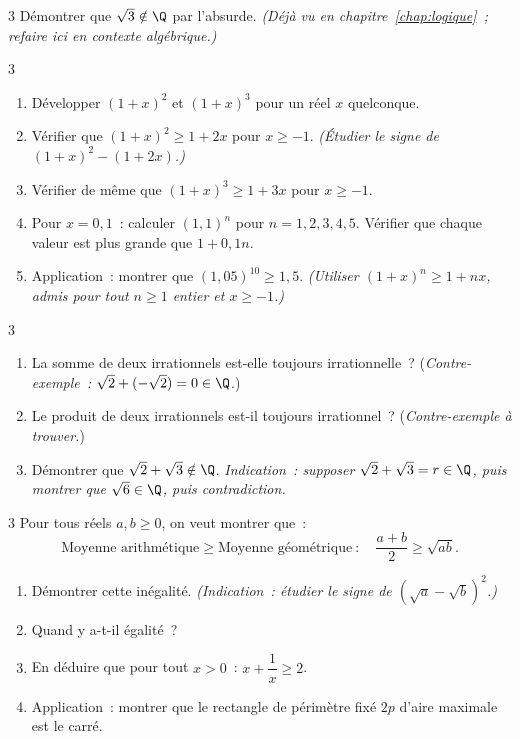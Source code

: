 \begin{exo}{3}
D\'emontrer que $\sqrt{3}\notin\Q$ par l'absurde.
\emph{(D\'ej\`a vu en chapitre~\ref{chap:logique}~; refaire ici en contexte alg\'ebrique.)}
\end{exo}

\begin{exo}{3}
\begin{enumerate}
  \item D\'evelopper $(1+x)^2$ et $(1+x)^3$ pour un r\'eel $x$ quelconque.
  \item V\'erifier que $(1+x)^2 \geq 1 + 2x$ pour $x \geq -1$.
        \emph{(\'Etudier le signe de $(1+x)^2 - (1+2x)$.)}
  \item V\'erifier de m\^eme que $(1+x)^3 \geq 1 + 3x$ pour $x \geq -1$.
  \item Pour $x = 0{,}1$~: calculer $(1{,}1)^n$ pour $n = 1,2,3,4,5$.
        V\'erifier que chaque valeur est plus grande que $1 + 0{,}1n$.
  \item Application~: montrer que $(1{,}05)^{10} \geq 1{,}5$.
        \emph{(Utiliser $(1+x)^n \geq 1+nx$, admis pour tout
        $n \geq 1$ entier et $x \geq -1$.)}
\end{enumerate}
\end{exo}

\begin{exo}{3}
\begin{enumerate}
  \item La somme de deux irrationnels est-elle toujours irrationnelle~?
        (\emph{Contre-exemple~:} $\sqrt{2} + (-\sqrt{2}) = 0 \in \Q$.)
  \item Le produit de deux irrationnels est-il toujours irrationnel~?
        (\emph{Contre-exemple \`a trouver.})
  \item D\'emontrer que $\sqrt{2}+\sqrt{3}\notin\Q$.
        \emph{Indication~: supposer $\sqrt{2}+\sqrt{3} = r \in \Q$,
        puis montrer que $\sqrt{6} \in \Q$, puis contradiction.}
\end{enumerate}
\end{exo}

\begin{exo}{3}
Pour tous r\'eels $a, b \geq 0$, on veut montrer que~:
$$\text{Moyenne arithm\'etique} \geq \text{Moyenne g\'eom\'etrique}~:
\quad\frac{a+b}{2} \geq \sqrt{ab}.$$
\begin{enumerate}
  \item D\'emontrer cette in\'egalit\'e.
        \emph{(Indication~: \'etudier le signe de $(\sqrt{a}-\sqrt{b})^2$.)}
  \item Quand y a-t-il \'egalit\'e~?
  \item En d\'eduire que pour tout $x > 0$~:
        $x + \dfrac{1}{x} \geq 2$.
  \item Application~: montrer que le rectangle de p\'erim\`etre fix\'e $2p$
        d'aire maximale est le carr\'e.
\end{enumerate}
\end{exo}

